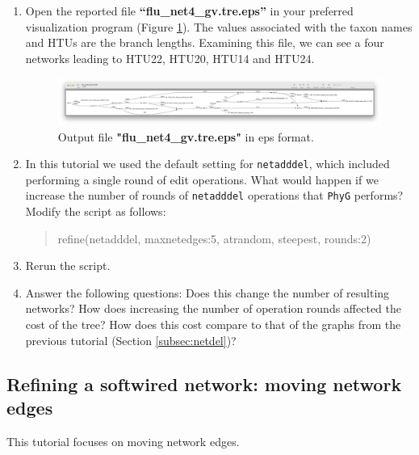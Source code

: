 \documentclass[11pt]{article}
\newcommand{\phyg}{\texttt{PhyG} }
\begin{document}
\begin {enumerate}
\item  Open the reported file \textbf{``flu\_net4\_gv.tre.eps''} in your preferred
visualization program (Figure \ref{eps4}). The values associated with the taxon 
names and HTUs are the branch lengths. Examining this file, we can see a four
networks leading to HTU22, HTU20, HTU14 and HTU24.

\begin{figure}[H]
\centering
\includegraphics[width=\textwidth]{eps4.png}
\caption{Output file \textbf{"flu\_net4\_gv.tre.eps"} in eps format.}
\label{eps4}
\end{figure}

\item In this tutorial we used the default setting for \texttt{netadddel}, which 
included performing a single round of edit operations. What would happen 
if we increase the number of rounds of \texttt{netadddel} operations that \phyg 
performs? \\

Modify the script as follows:

	\begin{quote}
	refine(netadddel, maxnetedges:5, atrandom, steepest, rounds:2)
	\end{quote}
	
\item Rerun the script.

\item Answer the following questions: 
\subitem Does this change the number of resulting networks?
\subitem How does increasing the number of operation rounds affected the 
cost of the tree?
\subitem How does this cost compare to that of the graphs from the previous 
tutorial (Section \ref{subsec:netdel})?

\end{enumerate}
\subsection{Refining a softwired network: moving network edges}
\label{subsec:softnetmove}

This tutorial focuses on moving network edges.
\end{document}
